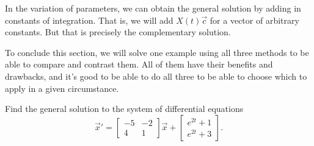 \documentclass{ximera}
\begin{document}
In the variation of parameters, %
we can obtain the general solution by adding in constants of integration. That is, we will add $X(t) \vec{c}$ for a vector of arbitrary constants. But that is precisely the complementary solution.

To conclude this section, we will solve one example using all three methods to be able to compare and contrast them. All of them have their benefits and drawbacks, and it's good to be able to do all three to be able to choose which to apply in a given circumstance.

\begin{example}
    Find the general solution to the system of differential equations
    \begin{equation*}
        \vec{x}' = \begin{bmatrix} -5 & -2 \\ 4 & 1 \end{bmatrix} \vec{x} + \begin{bmatrix} e^{2t} + 1 \\ e^{2t} + 3 \end{bmatrix} .
    \end{equation*}
\end{example}
\end{document}
